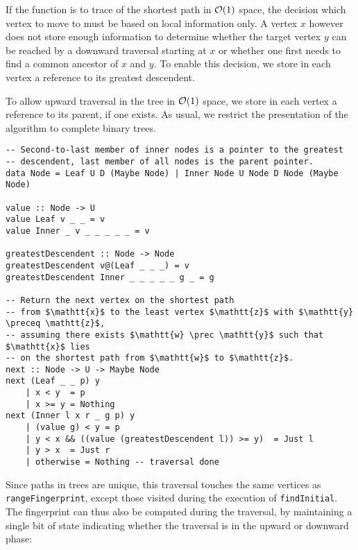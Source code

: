 If the function is to trace of the shortest path in $\mathcal{O}(1)$ space, the decision which vertex to move to must be based on local information only. A vertex $x$ however does not store enough information to determine whether the target vertex $y$ can be reached by a downward traversal starting at $x$ or whether one first needs to find a common ancestor of $x$ and $y$. To enable this decision, we store in each vertex a reference to its greatest descendent.

To allow upward traversal in the tree in $\mathcal{O}(1)$ space, we store in each vertex a reference to its parent, if one exists. As usual, we restrict the presentation of the algorithm to complete binary trees.

\begin{verbatim}
-- Second-to-last member of inner nodes is a pointer to the greatest
-- descendent, last member of all nodes is the parent pointer.
data Node = Leaf U D (Maybe Node) | Inner Node U Node D Node (Maybe Node)

value :: Node -> U
value Leaf v _ _ = v
value Inner _ v _ _ _ _ _ = v

greatestDescendent :: Node -> Node
greatestDescendent v@(Leaf _ _ _) = v
greatestDescendent Inner _ _ _ _ _ g _ = g

-- Return the next vertex on the shortest path
-- from $\mathtt{x}$ to the least vertex $\mathtt{z}$ with $\mathtt{y} \preceq \mathtt{z}$,
-- assuming there exists $\mathtt{w} \prec \mathtt{y}$ such that $\mathtt{x}$ lies
-- on the shortest path from $\mathtt{w}$ to $\mathtt{z}$.
next :: Node -> U -> Maybe Node
next (Leaf _ _ p) y
    | x < y  = p
    | x >= y = Nothing
next (Inner l x r _ g p) y
    | (value g) < y = p
    | y < x && ((value (greatestDescendent l)) >= y)  = Just l
    | y > x  = Just r
    | otherwise = Nothing -- traversal done
\end{verbatim}

Since paths in trees are unique, this traversal touches the same vertices as \texttt{rangeFingerprint}, except those visited during the execution of \texttt{findInitial}. The fingerprint can thus also be computed during the traversal, by maintaining a single bit of state indicating whether the traversal is in the upward or downward phase:

